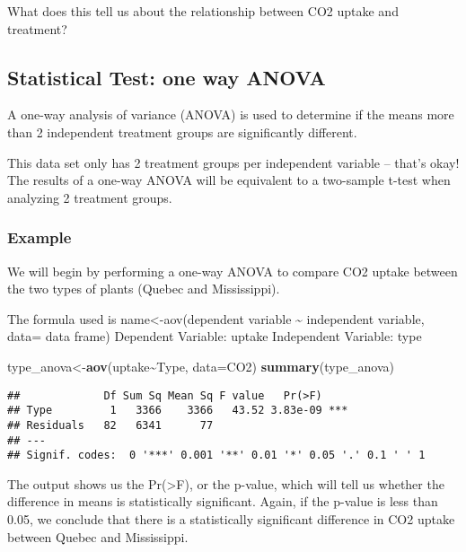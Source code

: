 \documentclass[
]{article}
\newenvironment{Shaded}{\begin{snugshade}}{\end{snugshade}}
\newcommand{\AttributeTok}[1]{\textcolor[rgb]{0.13,0.29,0.53}{#1}}
\newcommand{\FunctionTok}[1]{\textcolor[rgb]{0.13,0.29,0.53}{\textbf{#1}}}
\newcommand{\NormalTok}[1]{#1}
\newcommand{\OtherTok}[1]{\textcolor[rgb]{0.56,0.35,0.01}{#1}}
\newcommand{\SpecialCharTok}[1]{\textcolor[rgb]{0.81,0.36,0.00}{\textbf{#1}}}
\begin{document}
What does this tell us about the relationship between CO2 uptake and
treatment?

\subsection{Statistical Test: one way
ANOVA}\label{statistical-test-one-way-anova}

A one-way analysis of variance (ANOVA) is used to determine if the means
more than 2 independent treatment groups are significantly different.

This data set only has 2 treatment groups per independent variable --
that's okay! The results of a one-way ANOVA will be equivalent to a
two-sample t-test when analyzing 2 treatment groups.

\subsubsection{Example}\label{example-2}

We will begin by performing a one-way ANOVA to compare CO2 uptake
between the two types of plants (Quebec and Mississippi).

The formula used is name\textless-aov(dependent variable
\textasciitilde{} independent variable, data= data frame) Dependent
Variable: uptake Independent Variable: type

\begin{Shaded}
\begin{Highlighting}[]
\NormalTok{type\_anova}\OtherTok{\textless{}{-}}\FunctionTok{aov}\NormalTok{(uptake}\SpecialCharTok{\textasciitilde{}}\NormalTok{Type, }\AttributeTok{data=}\NormalTok{CO2)}
\FunctionTok{summary}\NormalTok{(type\_anova)}
\end{Highlighting}
\end{Shaded}

\begin{verbatim}
##             Df Sum Sq Mean Sq F value   Pr(>F)    
## Type         1   3366    3366   43.52 3.83e-09 ***
## Residuals   82   6341      77                     
## ---
## Signif. codes:  0 '***' 0.001 '**' 0.01 '*' 0.05 '.' 0.1 ' ' 1
\end{verbatim}

The output shows us the Pr(\textgreater F), or the p-value, which will
tell us whether the difference in means is statistically significant.
Again, if the p-value is less than 0.05, we conclude that there is a
statistically significant difference in CO2 uptake between Quebec and
Mississippi.
\end{document}
